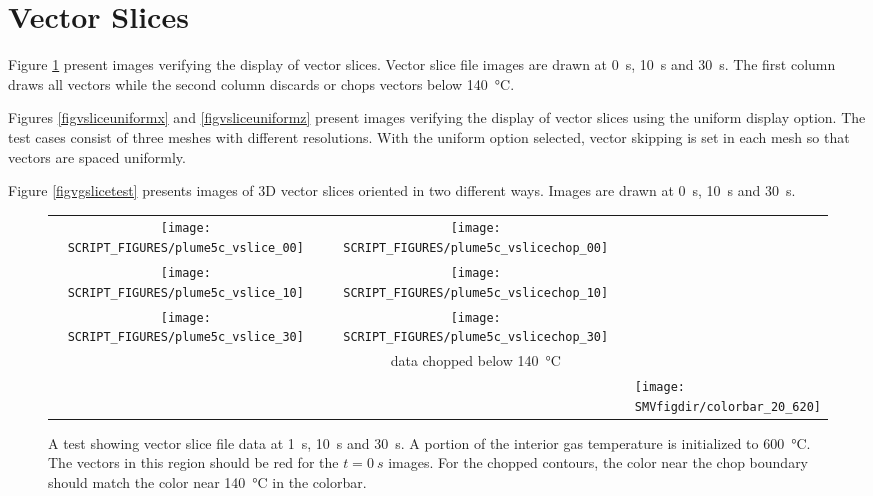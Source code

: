 \documentclass[11pt,twoside]{book}
\begin{document}
\clearpage

\section{Vector Slices}
Figure \ref{figvslicetest} present images verifying the display of vector slices.
Vector slice file images are drawn at \SI{0}{s}, \SI{10}{s} and \SI{30}{s}.
The first column draws all vectors while the second column discards or chops vectors
below \SI{140}{\degreeCelsius}.

Figures \ref{figvsliceuniformx} and \ref{figvsliceuniformz} present images verifying the display of vector slices using the uniform display option.
The test cases consist of three meshes with different resolutions.  With the uniform option selected, vector
skipping is set in each mesh so that vectors are spaced uniformly.

Figure \ref{figvgslicetest} presents images of 3D vector slices oriented in two different
ways. Images are drawn at \SI{0}{s}, \SI{10}{s} and \SI{30}{s}.


\begin{figure}[bph]
\begin{center}
\begin{tabular}{ccl}
 \texttt{[image: SCRIPT\_FIGURES/plume5c\_vslice\_00]}&
 \texttt{[image: SCRIPT\_FIGURES/plume5c\_vslicechop\_00]}\\
 \texttt{[image: SCRIPT\_FIGURES/plume5c\_vslice\_10]}&
 \texttt{[image: SCRIPT\_FIGURES/plume5c\_vslicechop\_10]}\\
 \texttt{[image: SCRIPT\_FIGURES/plume5c\_vslice\_30]}&
 \texttt{[image: SCRIPT\_FIGURES/plume5c\_vslicechop\_30]}\\
 &data chopped below \SI{140}{\degreeCelsius}\\
 &&\raisebox{0.5in}[0pt]{\texttt{[image: \\SMVfigdir/colorbar\_20\_620]}}\\

 \end{tabular}
\end{center}
 \caption[A test showing vector slice file data] {A test showing vector slice file data
 at \SI{1}{s}, \SI{10}{s} and \SI{30}{s}. A portion of the interior gas temperature
 is initialized to \SI{600}{\degreeCelsius}.  The vectors in this region should be
 red for the $t=\SI{0}{s}$ images. For the chopped contours, the color near the chop
 boundary should match the color near \SI{140}{\degreeCelsius} in the colorbar.}
\label{figvslicetest}%
\end{figure}
\end{document}
